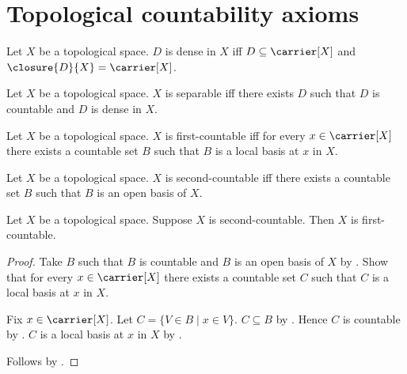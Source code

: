 \section{Topological countability axioms}





\begin{definition}\label{is_dense_in}
    Let $X$ be a topological space.
    $D$ is dense in $X$ iff
        $D\subseteq\carrier[X]$ and
        $\closure{D}{X}=\carrier[X]$.
\end{definition}

\begin{definition}\label{is_separable}
    Let $X$ be a topological space.
    $X$ is separable iff there exists $D$ such that
        $D$ is countable and $D$ is dense in $X$.
\end{definition}

\begin{definition}\label{is_first_countable}
    Let $X$ be a topological space.
    $X$ is first-countable iff for every $x\in\carrier[X]$
        there exists a countable set $B$ such that
            $B$ is a local basis at $x$ in $X$.
\end{definition}

\begin{definition}\label{is_second_countable}
    Let $X$ be a topological space.
    $X$ is second-countable iff there exists a countable set $B$ such that
        $B$ is an open basis of $X$.
\end{definition}

\begin{theorem}\label{second_countable_implies_first_countable}
    Let $X$ be a topological space.
    Suppose $X$ is second-countable.
    Then $X$ is first-countable.
\end{theorem}
\begin{proof}
    Take $B$ such that $B$ is countable and $B$ is an open basis of $X$
        by .
    Show that for every $x\in\carrier[X]$ there exists a countable set $C$
        such that $C$ is a local basis at $x$ in $X$.
    \begin{subproof}
        Fix $x\in\carrier[X]$.
        Let $C=\{V\in B\mid x\in V\}$.
        $C\subseteq B$ by .
        Hence $C$ is countable by .
        $C$ is a local basis at $x$ in $X$
            by .
    \end{subproof}
    Follows by .
\end{proof}

